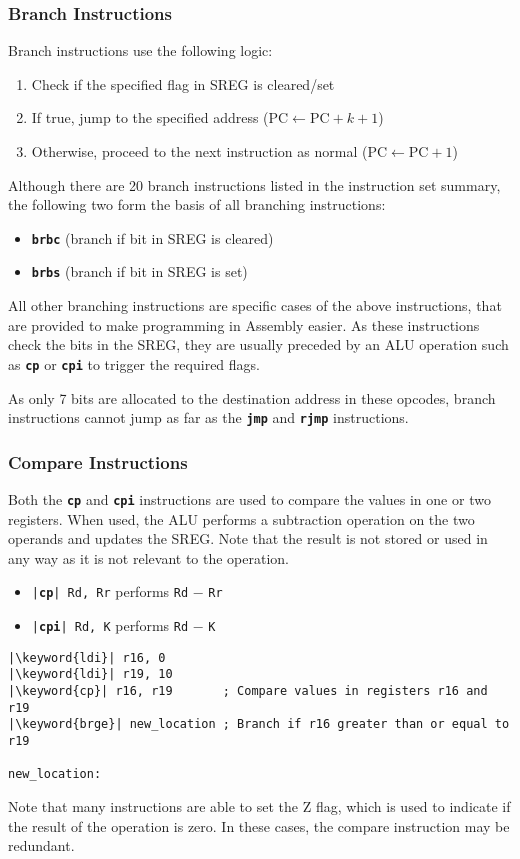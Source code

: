 \documentclass{article}
\newcommand{\keyword}[1]{\textcolor[rgb]{0.00,0.50,0.00}{\textbf{#1}}}
\newcommand{\keywordinline}[1]{\textcolor[rgb]{0.00,0.50,0.00}{\textbf{\texttt{#1}}}}
\begin{document}
\subsubsection{Branch Instructions}
Branch instructions use the following logic:
\begin{enumerate}
    \item Check if the specified flag in SREG is cleared/set
    \item If true, jump to the specified address (\(\mathrm{PC}
          \leftarrow \mathrm{PC} + k + 1\))
    \item Otherwise, proceed to the next instruction as normal
          (\(\mathrm{PC} \leftarrow \mathrm{PC} + 1\))
\end{enumerate}
Although there are 20 branch instructions listed in the instruction
set summary, the following two form the basis of all branching
instructions:
\begin{itemize}
    \item \keywordinline{brbc} (branch if bit in SREG is cleared)
    \item \keywordinline{brbs} (branch if bit in SREG is set)
\end{itemize}
All other branching instructions are specific cases of the above
instructions, that are provided to make programming in Assembly easier.
As these instructions check the bits in the SREG, they are usually
preceded by an ALU operation such as \keywordinline{cp} or
\keywordinline{cpi} to trigger the required flags.

As only 7 bits are allocated to the destination address in these
opcodes, branch instructions cannot jump as far as the
\keywordinline{jmp} and \keywordinline{rjmp} instructions.
\subsubsection{Compare Instructions}
Both the \keywordinline{cp} and \keywordinline{cpi} instructions are
used to compare the values in one or two registers. When used, the ALU
performs a subtraction operation on the two operands and updates the
SREG\@. Note that the result is not stored or used in any way as it is
not relevant to the operation.
\begin{itemize}
    \item \texttt{|\keyword{cp}| Rd, Rr} performs \texttt{Rd} \(-\) \texttt{Rr}
    \item \texttt{|\keyword{cpi}| Rd, K} performs \texttt{Rd} \(-\) \texttt{K}
\end{itemize}
\begin{verbatim}
|\keyword{ldi}| r16, 0
|\keyword{ldi}| r19, 10
|\keyword{cp}| r16, r19       ; Compare values in registers r16 and r19
|\keyword{brge}| new_location ; Branch if r16 greater than or equal to r19

new_location:
\end{verbatim}
Note that many instructions are able to set the Z flag, which is used
to indicate if the result of the operation is zero. In these cases, the
compare instruction may be redundant.
\end{document}
